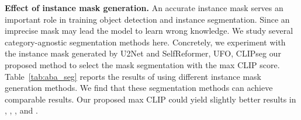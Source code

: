\documentclass{article}
\begin{document}
\noindent \textbf{Effect of instance mask generation.}
An accurate instance mask serves an important role in training object detection and instance segmentation. Since an imprecise mask may lead the model to learn wrong knowledge. We study several category-agnostic segmentation methods here. Concretely, we experiment with the instance mask generated by U2Net\cite{U2Net} and SelfReformer\cite{selfreformer}, UFO\cite{UFO}, CLIPseg \cite{CLIPseg} our proposed method to select the mask segmentation with the max CLIP score. Table~\ref{tab:aba_seg} reports the results of using different instance mask generation methods. We find that these segmentation methods can achieve comparable results. Our proposed max CLIP could yield slightly better results in , , , and .


\begin{table}[t]
  \small
  \centering
\vspace{-2mm}
\caption{Comparison of using different segmentation methods.}
\vspace{-4mm}
\label{tab:aba_seg}
\end{table}
\end{document}
